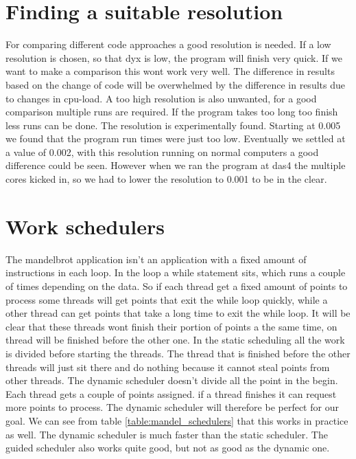 \documentclass[a4paper]{article}
\begin{document}
\section{Finding a suitable resolution}
	For comparing different code approaches a good resolution is needed.
	If a low resolution is chosen, so that dyx is low, the program will finish very quick.
	If we want to make a comparison this wont work very well.
	The difference in results based on the change of code will be overwhelmed by the difference in results due to changes in cpu-load.
	A too high resolution is also unwanted, for a good comparison multiple runs are required.
	If the program takes too long too finish less runs can be done.
	The resolution is experimentally found.
	Starting at 0.005 we found that the program run times were just too low.
	Eventually we settled at a value of 0.002, with this resolution running on normal computers a good difference could be seen.
	However when we ran the program at das4 the multiple cores kicked in, so we had to lower the resolution to 0.001 to be in the clear.
	

\section{Work schedulers}
	The mandelbrot application isn't an application with a fixed amount of instructions in each loop.
	In the loop a while statement sits, which runs a couple of times depending on the data.
	So if each thread get a fixed amount of points to process some threads will get points that exit the while loop quickly, while a other thread can get points that take a long time to exit the while loop.
	It will be clear that these threads wont finish their portion of points a the same time, on thread will be finished before the other one.
	In the static scheduling all the work is divided before starting the threads.
	The thread that is finished before the other threads will just sit there and do nothing because it cannot steal points from other threads.
	The dynamic scheduler doesn't divide all the point in the begin. Each thread gets a couple of points assigned.
	if a thread finishes it can request more points to process. The dynamic scheduler will therefore be perfect for our goal.
	We can see from table \ref{table:mandel_schedulers} that this works in practice as well.
	The dynamic scheduler is much faster than the static scheduler.
	The guided scheduler also works quite good, but not as good as the dynamic one.
	
\end{document}
